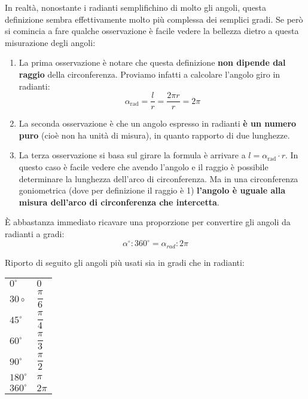 In realtà, nonostante i radianti semplifichino di molto gli angoli, questa 
definizione sembra effettivamente molto più complessa dei semplici gradi. Se 
però si comincia a fare qualche osservazione è facile vedere la bellezza dietro 
a questa misurazione degli angoli:
\begin{enumerate}
    \item La prima osservazione è notare che questa definizione \textbf{non 
        dipende dal raggio} della circonferenza. Proviamo infatti a calcolare 
        l'angolo giro in radianti:
        \begin{equation*}
            \alpha_{\mathrm{rad}} = \dfrac{l}{r} = \dfrac{2\pi r}{r} = 2\pi
        \end{equation*}
        
    \item La seconda osservazione è che un angolo espresso in radianti 
        \textbf{è un numero puro} (cioè non ha unità di misura), in quanto 
        rapporto di due lunghezze.
    
    \item La terza osservazione si basa sul girare la formula è arrivare a 
        $l = \alpha_\mathrm{rad}\cdot r$. In questo caso è facile vedere che 
        avendo l'angolo e il raggio è possibile determinare la lunghezza 
        dell'arco di circonferenza. Ma in una circonferenza goniometrica (dove 
        per definizione il raggio è 1) \textbf{l'angolo è uguale alla misura 
        dell'arco di circonferenza che intercetta}.
\end{enumerate}
È abbastanza immediato ricavare una proporzione per convertire gli angoli da 
radianti a gradi:
\begin{equation*}
	\alpha^\circ : 360^\circ = \alpha_{rad} : 2\pi
\end{equation*}

Riporto di seguito gli angoli più usati sia in gradi che in radianti:
\begin{table}[H]
\centering
\bgroup
\def\arraystretch{2}%
\begin{tabular}{l|l}
$0^\circ$                                  & $0$             \\
$30\circ$                                  & $\dfrac{\pi}{6}$ \\
$45^\circ$                                 & $\dfrac{\pi}{4}$ \\
$60^\circ$                                 & $\dfrac{\pi}{3}$ \\
$90^\circ$                                 & $\dfrac{\pi}{2}$ \\
$180^\circ$                                & $\pi$           \\
$360^\circ$                                & $2\pi$         
\end{tabular}
\egroup
\end{table}

